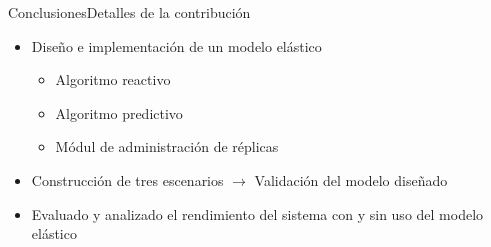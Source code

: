 \begin{frame}{Conclusiones}{Detalles de la contribución}

\begin{itemize}
\item Diseño e implementación de un modelo elástico
\begin{itemize}
	\item Algoritmo reactivo
	\item Algoritmo predictivo
	\item Módul de administración de réplicas
\end{itemize}
\item Construcción de tres escenarios $\rightarrow$ Validación del modelo diseñado
\item Evaluado y analizado el rendimiento del sistema con y sin uso del modelo elástico
\end{itemize}

\end{frame}